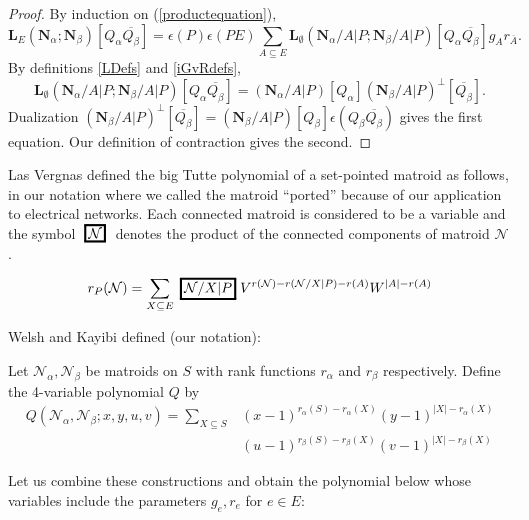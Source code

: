 \documentclass[Unicode]{cedram-alco}
\newcommand{\MVar}[1]{
  \setlength\fboxrule{1.5pt}
  \setlength\fboxsep{1.5pt}
  {\;\framebox{\ensuremath{#1}}\;}}
\newcommand{\ext}[1]{\ensuremath{\mathbf{#1}}}
\newcommand{\eNal}{\ensuremath{\ext{N}_{\alpha}}}
\newcommand{\eNbe}{\ensuremath{\ext{N}_\beta}}
\newcommand{\extLHorSub}[3]{\ext{L}_{#1}\left(  {#2}; {#3}  \right)}
\begin{document}
\begin{proof}
  By induction on (\ref{productequation}),
  \[
  \extLHorSub{E}{\eNal}{\eNbe}  [Q_{\alpha}\overline{Q_{\beta}}] = \epsilon(P)\epsilon(PE)
  \sum_{A\subseteq E}\extLHorSub{\emptyset}{\ext{N}_\alpha/A|P}{\ext{N}_\beta/A|P}[Q_{\alpha}\overline{Q_{\beta}}]
  g_Ar_{\overline{A}}.
  \]
By definitions \ref{LDefs} and \ref{iGvRdefs}, 
  \[
\extLHorSub{\emptyset}{\ext{N}_\alpha/A|P}{\ext{N}_\beta/A|P}[Q_{\alpha}\overline{Q_{\beta}}]
=(\ext{N}_\alpha/A|P)[Q_\alpha](\ext{N}_\beta/A|P)^\perp[\overline{Q_{\beta}}].
\]
Dualization $(\ext{N}_\beta/A|P)^\perp[\overline{Q_{\beta}}]=
(\ext{N}_\beta/A|P)[Q_{\beta}]\epsilon(Q_\beta\overline{Q_\beta})$
gives the first equation.
Our definition of contraction gives the second.
\end{proof}


Las Vergnas defined the big Tutte polynomial\cite{} of a set-pointed matroid
as follows, in our notation\cite{} where we called the matroid ``ported''
because of our application to electrical networks.  Each connected matroid
is considered to be a variable and the symbol $\MVar{\mathcal{N}}$ denotes
the product of the connected components of matroid $\mathcal{N}$.

\begin{equation}
  r_{P}(\mathcal{N}) = \sum_{X\subseteq E}\MVar{\mathcal{N}/X|P}
  V^{r(\mathcal{N}) - r(\mathcal{N}/X|P) -r(A)}
  W^{|A|-r(A)}
\end{equation}



Welsh and Kayibi\cite{WelshKayibiLinking} defined (our notation):
\begin{defi}
  Let $\mathcal{N}_\alpha, \mathcal{N}_\beta$ be matroids on $S$ with rank
  functions $r_\alpha$ and $r_\beta$ respectively.  Define the 4-variable
  polynomial $Q$ by
  \begin{equation}
\begin{split}
    Q(\mathcal{N}_\alpha, \mathcal{N}_\beta;x, y, u, v) =
  \sum_{X\subseteq S}
  &(x-1)^{r_\alpha(S)-r_\alpha(X)}
  (y-1)^{|X|-r_\alpha(X)}       \\
  &(u-1)^{r_\beta(S)-r_\beta(X)}
  (v-1)^{|X|-r_\beta(X)}
\end{split}
  \end{equation}
\end{defi}


Let us combine these constructions and obtain the polynomial below whose
variables include the parameters $g_e, r_e$ for $e\in E$:
\end{document}
